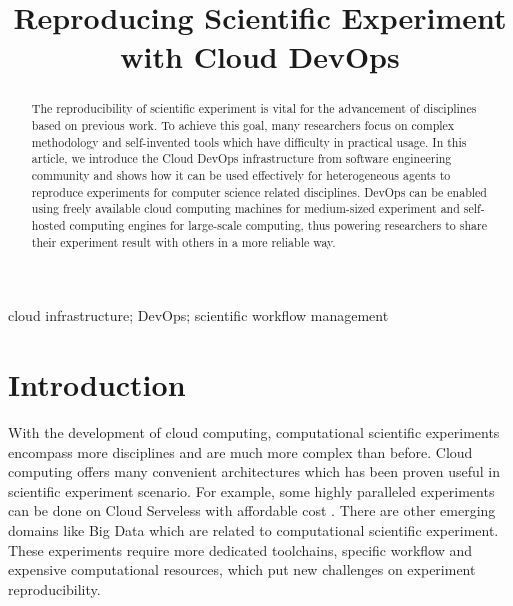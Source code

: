 \documentclass[10pt, conference, compsocconf]{IEEEtran}
\begin{document}
\title{Reproducing Scientific Experiment with Cloud DevOps}

\author{
\and
{}
\and
{}
\and
{}
}
\maketitle
\begin{abstract}
The reproducibility of scientific experiment is vital for the advancement of disciplines based on previous work. To achieve this goal, many researchers focus on complex methodology and self-invented tools which have difficulty in practical usage. In this article, we introduce the Cloud DevOps infrastructure from software engineering community and shows how it can be used effectively for heterogeneous agents to reproduce experiments for computer science related disciplines. DevOps can be enabled using freely available cloud computing machines for medium-sized experiment and self-hosted computing engines for large-scale computing, thus powering researchers to share their experiment result with others in a more reliable way.
\end{abstract}
\begin{IEEEkeywords}
cloud infrastructure; DevOps; scientific workflow management
\end{IEEEkeywords}

\section{Introduction}
With the development of cloud computing, computational scientific experiments encompass more disciplines and are much more complex than before. Cloud computing offers many convenient architectures which has been proven useful in scientific experiment scenario.  For example, some highly paralleled experiments can be done on Cloud Serveless with affordable cost \cite{niu2019leveraging}. There are other emerging domains like Big Data which are related to computational scientific experiment. These experiments require more dedicated toolchains, specific workflow and expensive computational resources, which put new challenges on experiment reproducibility.
\end{document}
